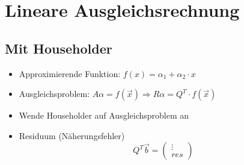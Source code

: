\section{Lineare Ausgleichsrechnung}

\subsection{Mit Householder}
\begin{itemize}
	
	\item Approximierende Funktion: $f(x) = \alpha_1 + \alpha_2 \cdot x$ \\
	
	\item Ausgleichsproblem: $A\alpha = f(\vec{x}) \Rightarrow R\alpha = Q^T \cdot f(\vec{x})$
	
	\item Wende Householder auf Ausgleichsproblem an
	
	\item Residuum (Näherungsfehler)
	\begin{displaymath}
		Q^T\vec{b} = 
		\begin{pmatrix}
			\vdots \\
			res
		\end{pmatrix}
	\end{displaymath}

\end{itemize}